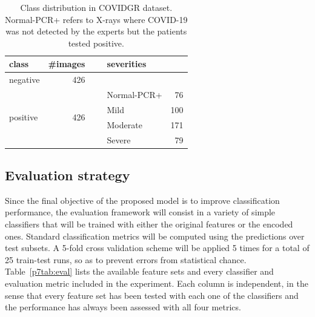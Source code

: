 \begin{table}[htbp]
    \centering
    \begin{tabular}{lrllr}
    \toprule
        \bfseries class & \bfseries \#images &~ &\bfseries  severities \\
        \midrule
         negative & 426 && &\\\midrule
         \multirow{4}{*}{positive} & \multirow{4}{*}{426} && Normal-PCR+& 76\\
         &&& Mild& 100\\
         &&& Moderate& 171\\
         &&& Severe& 79\\
         \bottomrule
    \end{tabular}
    \caption{Class distribution in COVIDGR dataset. Normal-PCR+ refers to X-rays where COVID-19 was not detected by the experts but the patients tested positive.}
    \label{p7tab:classdist}
\end{table}


\subsection{Evaluation strategy}

Since the final objective of the proposed model is to improve classification performance, the evaluation framework will consist in a variety of simple classifiers that will be trained with either the original features or the encoded ones. Standard classification metrics will be computed using the predictions over test subsets. A 5-fold cross validation scheme will be applied 5 times for a total of 25 train-test runs, so as to prevent errors from statistical chance. Table~\ref{p7tab:eval} lists the available feature sets and every classifier and evaluation metric included in the experiment. Each column is independent, in the sense that every feature set has been tested with each one of the classifiers and the performance has always been assessed with all four metrics.

